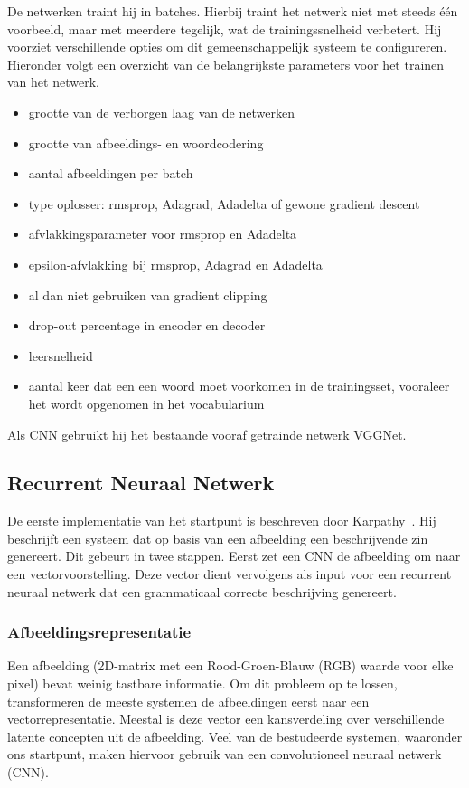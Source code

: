 De netwerken traint hij in batches. Hierbij traint het netwerk niet met steeds \'e\'en voorbeeld, maar met meerdere tegelijk, wat de trainingssnelheid verbetert. 
Hij voorziet verschillende opties om dit gemeenschappelijk systeem te configureren. Hieronder volgt een overzicht van de belangrijkste parameters voor het trainen van het netwerk.
\begin{itemize}
	\item grootte van de verborgen laag van de netwerken
	\item grootte van afbeeldings- en woordcodering
	\item aantal afbeeldingen per batch
	\item type oplosser: rmsprop, Adagrad, Adadelta of gewone gradient descent
	\item afvlakkingsparameter voor rmsprop en Adadelta
	\item epsilon-afvlakking bij rmsprop, Adagrad en Adadelta
	\item al dan niet gebruiken van gradient clipping
	\item drop-out percentage in encoder en decoder
	\item leersnelheid
	\item aantal keer dat een een woord moet voorkomen in de trainingsset, vooraleer het wordt opgenomen in het vocabularium
\end{itemize}
Als CNN gebruikt hij het bestaande vooraf getrainde netwerk VGGNet.

\subsection{Recurrent Neuraal Netwerk}
\label{sec:rnn_methodology}
De eerste implementatie van het startpunt is beschreven door Karpathy~\cite{Karpathy2015}. Hij beschrijft een systeem dat op basis van een afbeelding een beschrijvende zin genereert. Dit gebeurt in twee stappen. Eerst zet een CNN de afbeelding om naar een vectorvoorstelling. Deze vector dient vervolgens als input voor een recurrent neuraal netwerk dat een grammaticaal correcte beschrijving genereert.

\subsubsection{Afbeeldingsrepresentatie}
\label{sec:usedcnn}
Een afbeelding (2D-matrix met een Rood-Groen-Blauw (RGB) waarde voor elke pixel) bevat weinig tastbare informatie. Om dit probleem op te lossen, transformeren de meeste systemen de afbeeldingen eerst naar een vectorrepresentatie. Meestal is deze vector een kansverdeling over verschillende latente concepten uit de afbeelding. Veel van de bestudeerde systemen, waaronder ons startpunt, maken hiervoor gebruik van een convolutioneel neuraal netwerk (CNN).

